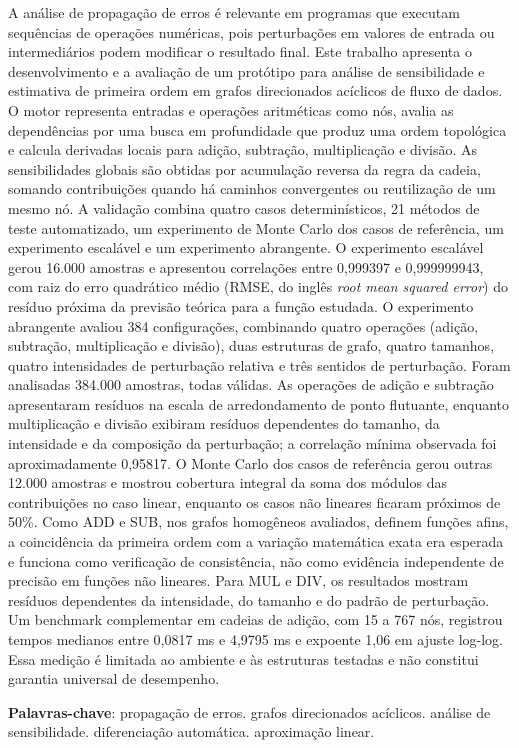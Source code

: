 \documentclass[12pt,openright,oneside,a4paper,brazil]{abntex2}
\begin{document}
\begin{resumo}
A análise de propagação de erros é relevante em programas que executam sequências de operações numéricas, pois perturbações em valores de entrada ou intermediários podem modificar o resultado final. Este trabalho apresenta o desenvolvimento e a avaliação de um protótipo para análise de sensibilidade e estimativa de primeira ordem em grafos direcionados acíclicos de fluxo de dados. O motor representa entradas e operações aritméticas como nós, avalia as dependências por uma busca em profundidade que produz uma ordem topológica e calcula derivadas locais para adição, subtração, multiplicação e divisão. As sensibilidades globais são obtidas por acumulação reversa da regra da cadeia, somando contribuições quando há caminhos convergentes ou reutilização de um mesmo nó. A validação combina quatro casos determinísticos, 21 métodos de teste automatizado, um experimento de Monte Carlo dos casos de referência, um experimento escalável e um experimento abrangente. O experimento escalável gerou 16.000 amostras e apresentou correlações entre 0,999397 e 0,999999943, com raiz do erro quadrático médio (RMSE, do inglês \textit{root mean squared error}) do resíduo próxima da previsão teórica para a função estudada. O experimento abrangente avaliou 384 configurações, combinando quatro operações (adição, subtração, multiplicação e divisão), duas estruturas de grafo, quatro tamanhos, quatro intensidades de perturbação relativa e três sentidos de perturbação. Foram analisadas 384.000 amostras, todas válidas. As operações de adição e subtração apresentaram resíduos na escala de arredondamento de ponto flutuante, enquanto multiplicação e divisão exibiram resíduos dependentes do tamanho, da intensidade e da composição da perturbação; a correlação mínima observada foi aproximadamente 0,95817. O Monte Carlo dos casos de referência gerou outras 12.000 amostras e mostrou cobertura integral da soma dos módulos das contribuições no caso linear, enquanto os casos não lineares ficaram próximos de 50\%. Como ADD e SUB, nos grafos homogêneos avaliados, definem funções afins, a coincidência da primeira ordem com a variação matemática exata era esperada e funciona como verificação de consistência, não como evidência independente de precisão em funções não lineares. Para MUL e DIV, os resultados mostram resíduos dependentes da intensidade, do tamanho e do padrão de perturbação. Um benchmark complementar em cadeias de adição, com 15 a 767 nós, registrou tempos medianos entre 0,0817 ms e 4,9795 ms e expoente 1,06 em ajuste log-log. Essa medição é limitada ao ambiente e às estruturas testadas e não constitui garantia universal de desempenho.

\vspace{\onelineskip}
\noindent\textbf{Palavras-chave}: propagação de erros. grafos direcionados acíclicos. análise de sensibilidade. diferenciação automática. aproximação linear.
\end{resumo}
\end{document}

